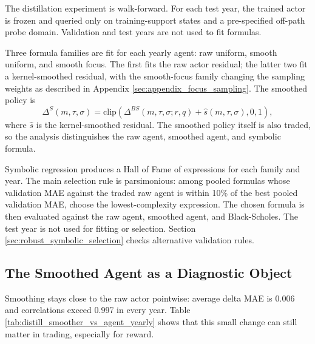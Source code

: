 \documentclass[a4paper,12pt]{article}
\numberwithin{equation}{section}
\begin{document}
The distillation experiment is walk-forward. For each test year, the trained actor is frozen and queried only on training-support states and a pre-specified off-path probe domain. Validation and test years are not used to fit formulas.

Three formula families are fit for each yearly agent: raw uniform, smooth uniform, and smooth focus. The first fits the raw actor residual; the latter two fit a kernel-smoothed residual, with the smooth-focus family changing the sampling weights as described in Appendix \ref{sec:appendix_focus_sampling}. The smoothed policy is
\begin{equation}
    \Delta^{S}(m,\tau,\sigma)
    =
    \mathrm{clip}\left(
        \Delta^{BS}(m,\tau,\sigma;r,q)
        +
        \widehat{s}(m,\tau,\sigma),
        0,1
    \right),
    \label{eq:smoothed_policy}
\end{equation}
where $\widehat{s}$ is the kernel-smoothed residual. The smoothed policy itself is also traded, so the analysis distinguishes the raw agent, smoothed agent, and symbolic formula.

Symbolic regression produces a Hall of Fame of expressions for each family and year. The main selection rule is parsimonious: among pooled formulas whose validation MAE against the traded raw agent is within 10\% of the best pooled validation MAE, choose the lowest-complexity expression. The chosen formula is then evaluated against the raw agent, smoothed agent, and Black-Scholes. The test year is not used for fitting or selection. Section \ref{sec:robust_symbolic_selection} checks alternative validation rules.

\subsection{The Smoothed Agent as a Diagnostic Object}

Smoothing stays close to the raw actor pointwise: average delta MAE is 0.006 and correlations exceed 0.997 in every year. Table \ref{tab:distill_smoother_vs_agent_yearly} shows that this small change can still matter in trading, especially for reward.

\begin{table}[H]
    \centering
    \caption{Smoothed policy relative to the raw traded agent. Entries are year-by-year smoothed-minus-raw-agent results; $^{*}$, $^{**}$, and $^{***}$ denote two-sided 10\%, 5\%, and 1\% two-stage bootstrap significance, respectively. Reward and CVaR entries are differences; variance entries are log ratios, so negative values are favorable.}
    \label{tab:distill_smoother_vs_agent_yearly}
    
\end{table}
\end{document}
